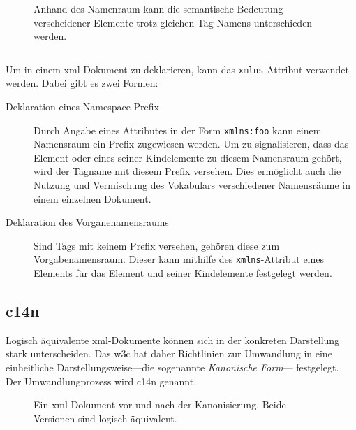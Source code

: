 \begin{figure}[h]
    \begin{example}
        \label{ex:xmlns}
        Anhand des Namenraum kann die semantische Bedeutung verscheidener Elemente trotz gleichen Tag-Namens unterschieden werden.
        \inputminted[firstline=2,firstnumber=1]{xml}{ex-xmlns.xml}
    \end{example}
\end{figure}

Um in einem \acrshort{xml}-Dokument zu deklarieren, kann das \texttt{xmlns}-Attribut verwendet werden. Dabei gibt es zwei Formen:

\begin{description}
    \item[Deklaration eines Namespace Prefix] Durch Angabe eines Attributes in der Form \texttt{xmlns:foo} kann einem Namensraum ein Prefix zugewiesen werden. Um zu signalisieren, dass das Element oder eines seiner Kindelemente zu diesem Namensraum gehört, wird der Tagname mit diesem Prefix versehen. Dies ermöglicht auch die Nutzung und Vermischung des Vokabulars verschiedener Namensräume in einem einzelnen Dokument.
    \item[Deklaration des Vorganenamensraums] Sind Tags mit keinem Prefix versehen, gehören diese zum Vorgabenamensraum. Dieser kann mithilfe des \texttt{xmlns}-Attribut eines Elements für das Element und seiner Kindelemente festgelegt werden.
\end{description}

\subsection{\acrfull{c14n}}
\label{sec:c14n}

Logisch äquivalente \acrshort{xml}-Dokumente können sich in der konkreten Darstellung
stark unterscheiden. Das \gls{w3c} hat daher Richtlinien zur Umwandlung in eine
einheitliche Darstellungsweise---die sogenannte \emph{Kanonische Form}---
festgelegt. Der Umwandlungprozess wird \acrfull{c14n} genannt.\cite{boyer2001c14n}

\begin{figure}[h!]
\begin{example}[Kanonisierung]
\label{ex:c14n}

Ein \acrshort{xml}-Dokument vor und nach der Kanonisierung. Beide Versionen sind
logisch äquivalent.

\inputminted{xml}{ex-c14n-pre.xml}
\inputminted{xml}{ex-c14n-post.xml}
\end{example}
\end{figure}

